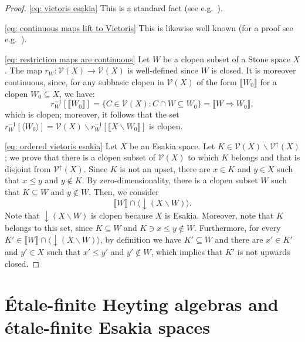 \documentclass[12pt]{amsart}
\theoremstyle{plain}
\theoremstyle{definition}
\newcommand{\V}{\mathcal{V}}
\newcommand{\Vu}{\V^{\uparrow}}
\newcommand{\tru}[1]{\llbracket #1 \rrbracket}
\newcommand{\climp}{\Rightarrow}
\renewcommand{\d}{{\downarrow}}
\begin{document}
\begin{proof}
    \eqref{eq: vietoris esakia} This is a standard fact (see e.g.\ \cite[Thm.~4.2]{Michael1951TopologiesOS}). 
    
    \eqref{eq: continuous maps lift to Vietoris} This is likewise well known (for a proof see e.g.\ \cite[Lem.~3.9]{Kupke2004}).

    \eqref{eq: restriction maps are continuous}
    Let $W$ be a clopen subset of a Stone space $X$.
    The map $r_{W}\colon \V(X)\to \V(X)$ is well-defined since $W$ is closed. It is moreover continuous, since, for any subbasic clopen in $\V(X)$ of the form $\tru{W_{0}}$ for a clopen $W_{0}\subseteq X$, we have:
    \begin{equation*}
        r_{W}^{-1}[\tru{W_{0}}]=\{C\in \V(X) : C\cap W\subseteq W_{0}\}=\tru{W\climp W_{0}},
    \end{equation*}
    which is clopen; moreover, it follows that the set $r_{W}^{-1}[\langle W_{0} \rangle] = \V(X) \smallsetminus r_{W}^{-1}[\tru{X \smallsetminus W_{0}}]$ is clopen.
    
    \eqref{eq: ordered vietoris esakia} Let $X$ be an Esakia space. Let $K \in \V(X) \smallsetminus \Vu(X)$; we prove that there is a clopen subset of $\V(X)$ to which $K$ belongs and that is disjoint from $\Vu(X)$. Since $K$ is not an upset, there are $x\in K$ and $y \in X$ such that $x\leq y$ and $y\notin K$. By zero-dimensionality, there is a clopen subset $W$ such that $K\subseteq W$ and $y\notin W$. Then, we consider
    \begin{equation*}
        \tru{W}\cap \langle {\d}(X\smallsetminus W)\rangle.
    \end{equation*}
    Note that ${\d}(X\smallsetminus W)$ is clopen because $X$ is Esakia.
    Moreover, note that $K$ belongs to this set, since $K\subseteq W$ and $K \ni x \leq y \notin W$. 
    Furthermore, for every $K'\in \tru{W}\cap \langle {\d}(X\smallsetminus W)\rangle$, by definition we have $K' \subseteq W$ and there are $x'\in K'$ and $y' \in X$ such that $x'\leq y'$ and $y'\notin W$, which implies that $K'$ is not upwards closed.
\end{proof}



\section{Étale-finite Heyting algebras and étale-finite Esakia spaces} \label{sec: etale-finite Heyting algebras}
\end{document}
